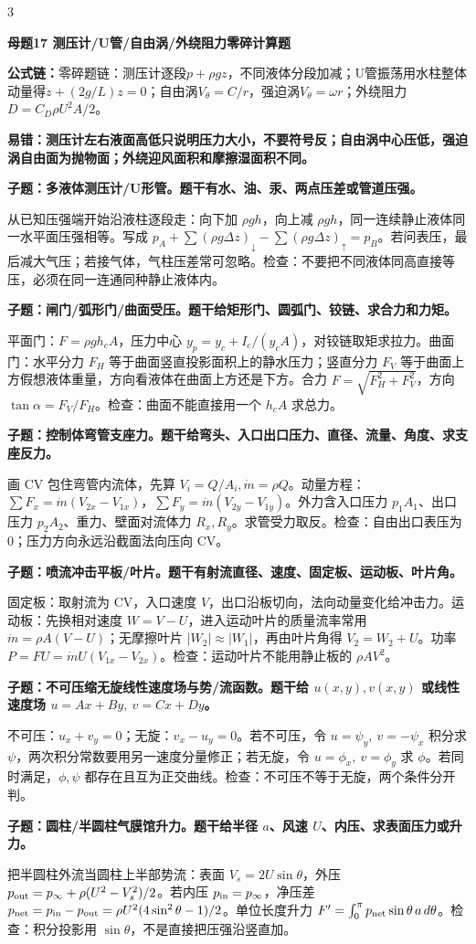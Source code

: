 \documentclass[a4paper]{article}
\newcommand{\mt}[1]{\vspace{0.12pt}\colorbox{M}{\parbox{\dimexpr\linewidth-2\fboxsep}{\color{white}\bfseries #1}}\par}
\newcommand{\qt}[1]{\vspace{0.04pt}\colorbox{Q}{\parbox{\dimexpr\linewidth-2\fboxsep}{\color{white}\bfseries #1}}\par}
\newcommand{\ans}[1]{\colorbox{G}{\parbox{\dimexpr\linewidth-2\fboxsep}{#1}}\par}
\newcommand{\warn}[1]{\colorbox{Y}{\parbox{\dimexpr\linewidth-2\fboxsep}{\color{E}\bfseries #1}}\par}
\newcommand{\form}[1]{{\color{M}\bfseries 公式链：}#1\par}
\begin{document}
\begin{multicols}{3}
\mt{母题17 测压计/U管/自由涡/外绕阻力零碎计算题}
\form{零碎题链：测压计逐段$p+\rho gz$，不同液体分段加减；U管振荡用水柱整体动量得$\ddot z+(2g/L)z=0$；自由涡$V_\theta=C/r$，强迫涡$V_\theta=\omega r$；外绕阻力$D=C_D\rho U^2A/2$。}
\warn{易错：测压计左右液面高低只说明压力大小，不要符号反；自由涡中心压低，强迫涡自由面为抛物面；外绕迎风面积和摩擦湿面积不同。}
\qt{子题：多液体测压计/U形管。题干有水、油、汞、两点压差或管道压强。}
\ans{从已知压强端开始沿液柱逐段走：向下加 $\rho gh$，向上减 $\rho gh$，同一连续静止液体同一水平面压强相等。写成 $p_A+\sum(\rho g\Delta z)_{\downarrow}-\sum(\rho g\Delta z)_{\uparrow}=p_B$。若问表压，最后减大气压；若接气体，气柱压差常可忽略。检查：不要把不同液体同高直接等压，必须在同一连通同种静止液体内。}
\qt{子题：闸门/弧形门/曲面受压。题干给矩形门、圆弧门、铰链、求合力和力矩。}
\ans{平面门：$F=\rho gh_cA$，压力中心 $y_p=y_c+I_c/(y_cA)$，对铰链取矩求拉力。曲面门：水平分力 $F_H$ 等于曲面竖直投影面积上的静水压力；竖直分力 $F_V$ 等于曲面上方假想液体重量，方向看液体在曲面上方还是下方。合力 $F=\sqrt{F_H^2+F_V^2}$，方向 $\tan\alpha=F_V/F_H$。检查：曲面不能直接用一个 $h_cA$ 求总力。}
\qt{子题：控制体弯管支座力。题干给弯头、入口出口压力、直径、流量、角度、求支座反力。}
\ans{画 CV 包住弯管内流体，先算 $V_i=Q/A_i,\dot m=\rho Q$。动量方程：$\sum F_x=\dot m(V_{2x}-V_{1x})$，$\sum F_y=\dot m(V_{2y}-V_{1y})$。外力含入口压力 $p_1A_1$、出口压力 $p_2A_2$、重力、壁面对流体力 $R_x,R_y$。求管受力取反。检查：自由出口表压为0；压力方向永远沿截面法向压向 CV。}
\qt{子题：喷流冲击平板/叶片。题干有射流直径、速度、固定板、运动板、叶片角。}
\ans{固定板：取射流为 CV，入口速度 $V$，出口沿板切向，法向动量变化给冲击力。运动板：先换相对速度 $W=V-U$，进入运动叶片的质量流率常用 $\dot m=\rho A(V-U)$；无摩擦叶片 $|W_2|\approx |W_1|$，再由叶片角得 $V_2=W_2+U$。功率 $P=FU=\dot mU(V_{1x}-V_{2x})$。检查：运动叶片不能用静止板的 $\rho AV^2$。}
\qt{子题：不可压缩无旋线性速度场与势/流函数。题干给 $u(x,y),v(x,y)$ 或线性速度场 $u=Ax+By,\ v=Cx+Dy$。}
\ans{不可压：$u_x+v_y=0$；无旋：$v_x-u_y=0$。若不可压，令 $u=\psi_y,\ v=-\psi_x$ 积分求 $\psi$，两次积分常数要用另一速度分量修正；若无旋，令 $u=\phi_x,\ v=\phi_y$ 求 $\phi$。若同时满足，$\phi,\psi$ 都存在且互为正交曲线。检查：不可压不等于无旋，两个条件分开判。}
\qt{子题：圆柱/半圆柱气膜馆升力。题干给半径 $a$、风速 $U$、内压、求表面压力或升力。}
\ans{把半圆柱外流当圆柱上半部势流：表面 $V_s=2U\sin\theta$，外压 $p_{\rm out}=p_\infty+\rho(U^2-V_s^2)/2$。若内压 $p_{\rm in}=p_\infty$，净压差 $p_{\rm net}=p_{\rm in}-p_{\rm out}=\rho U^2(4\sin^2\theta-1)/2$。单位长度升力 $F'=\int_0^\pi p_{\rm net}\sin\theta\,a\,d\theta$。检查：积分投影用 $\sin\theta$，不是直接把压强沿竖直加。}

\end{multicols}
\end{document}
